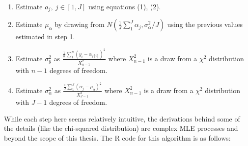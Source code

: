 \documentclass[12pt,twoside]{reedthesis}
\begin{document}
  \begin{enumerate}
    \item Estimate $a_j, \ j\in[1,J]$ using equations (1), (2).
    \item Estimate $\mu_{\alpha}$ by drawing from $N(\frac{1}{J}\sum_{1}^{J}\alpha_j, \sigma_{\alpha}^2/J)$ using the previous values estimated in step 1.
    \item Estimate $\sigma_y^2$ as $\frac{\frac{1}{n}\sum_{1}^{n}(y_i - \alpha_{j[i]})^2}{X_{n-1}^2}$ where $X_{n-1}^2$ is a draw from a $\chi^2$ distribution with $n-1$ degrees of freedom.
    \item Estimate $\sigma_{\alpha}^2$ as $\frac{\frac{1}{J}\sum_{1}^{J}(\alpha_j - \mu_{\alpha})^2}{X_{J-1}^2}$ where $X_{n-1}^2$ is a draw from a $\chi^2$ distribution with $J-1$ degrees of freedom.
  \end{enumerate}
  
  While each step here seems relatively intuitive, the derivations behind
  some of the details (like the chi-squared distribution) are complex MLE
  processes and beyond the scope of this thesis. The R code for this
  algorithm is as follows:
  
\end{document}
